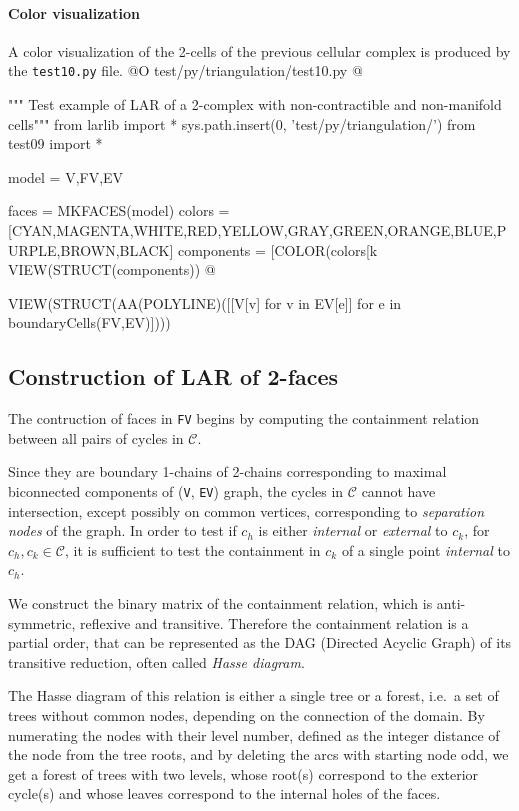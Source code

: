 \documentclass[11pt,oneside]{article}	%
\begin{document}
\paragraph{Color visualization}
A color visualization of the 2-cells of the previous cellular complex is produced by the \texttt{test10.py} file.
@O test/py/triangulation/test10.py
@{""" Test example of LAR of a 2-complex with non-contractible and non-manifold cells"""
from larlib import *
sys.path.insert(0, 'test/py/triangulation/')
from test09 import *

model = V,FV,EV

faces = MKFACES(model)
colors = [CYAN,MAGENTA,WHITE,RED,YELLOW,GRAY,GREEN,ORANGE,BLUE,PURPLE,BROWN,BLACK]
components = [COLOR(colors[k%
VIEW(STRUCT(components))
@}

VIEW(STRUCT(AA(POLYLINE)([[V[v] for v in EV[e]] for e in boundaryCells(FV,EV)])))

\subsection{Construction of LAR of 2-faces}

The contruction of faces in \texttt{FV} begins by computing the containment relation between all pairs of cycles in $\mathcal{C}$.

Since they are boundary 1-chains of 2-chains corresponding to maximal biconnected components of (\texttt{V}, \texttt{EV}) graph, the cycles in $\mathcal{C}$ cannot have intersection, except possibly on common vertices, corresponding to \emph{separation nodes} of the graph.
In order to test if $c_h$ is either \emph{internal} or \emph{external} to $c_k$, for $c_h, c_k \in \mathcal{C}$, it is sufficient to test the containment in $c_k$ of a single point \emph{internal} to $c_h$. 

We construct the binary matrix of the containment relation, which is anti-symmetric, reflexive and transitive.
Therefore the containment relation is a partial order, that can be represented as the DAG (Directed Acyclic Graph) of its transitive reduction,  often called \emph{Hasse diagram}.

The Hasse diagram of this relation is either a single tree or a forest, i.e.~a set of trees without common nodes, depending on the connection of the domain.
By numerating the nodes with their level number, defined as the integer distance of the node from the tree roots, and by deleting the arcs with starting node odd, we get a forest of trees with two levels, whose root(s) correspond to the exterior cycle(s) and whose leaves correspond to the internal holes of the faces.
\end{document}
